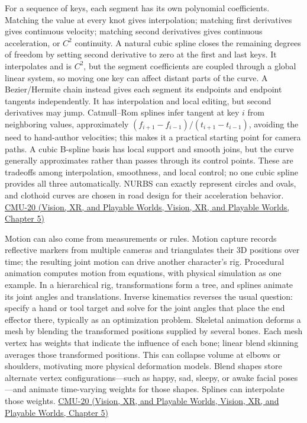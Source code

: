 For a sequence of keys, each segment has its own polynomial coefficients. Matching the value at every knot gives interpolation; matching first derivatives gives continuous velocity; matching second derivatives gives continuous acceleration, or \(C^2\) continuity. A natural cubic spline closes the remaining degrees of freedom by setting second derivative to zero at the first and last keys. It interpolates and is \(C^2\), but the segment coefficients are coupled through a global linear system, so moving one key can affect distant parts of the curve. A Bezier/Hermite chain instead gives each segment its endpoints and endpoint tangents independently. It has interpolation and local editing, but second derivatives may jump. Catmull--Rom splines infer tangent at key \(i\) from neighboring values, approximately \((f_{i+1}-f_{i-1})/(t_{i+1}-t_{i-1})\), avoiding the need to hand-author velocities; this makes it a practical starting point for camera paths. A cubic B-spline basis has local support and smooth joins, but the curve generally approximates rather than passes through its control points. These are tradeoffs among interpolation, smoothness, and local control; no one cubic spline provides all three automatically. NURBS can exactly represent circles and ovals, and clothoid curves are chosen in road design for their acceleration behavior. \href{../07-Vision-XR-and-Playable-Worlds/main.pdf\#nameddest=04-visual-computing-ii-ch036-cmu-20---introduction-to-animation}{CMU-20 (Vision, XR, and Playable Worlds, Vision, XR, and Playable Worlds, Chapter 5)}

Motion can also come from measurements or rules. Motion capture records reflective markers from multiple cameras and triangulates their 3D positions over time; the resulting joint motion can drive another character's rig. Procedural animation computes motion from equations, with physical simulation as one example. In a hierarchical rig, transformations form a tree, and splines animate its joint angles and translations. Inverse kinematics reverses the usual question: specify a hand or tool target and solve for the joint angles that place the end effector there, typically as an optimization problem. Skeletal animation deforms a mesh by blending the transformed positions supplied by several bones. Each mesh vertex has weights that indicate the influence of each bone; linear blend skinning averages those transformed positions. This can collapse volume at elbows or shoulders, motivating more physical deformation models. Blend shapes store alternate vertex configurations---such as happy, sad, sleepy, or awake facial poses---and animate time-varying weights for those shapes. Splines can interpolate those weights. \href{../07-Vision-XR-and-Playable-Worlds/main.pdf\#nameddest=04-visual-computing-ii-ch036-cmu-20---introduction-to-animation}{CMU-20 (Vision, XR, and Playable Worlds, Vision, XR, and Playable Worlds, Chapter 5)}

